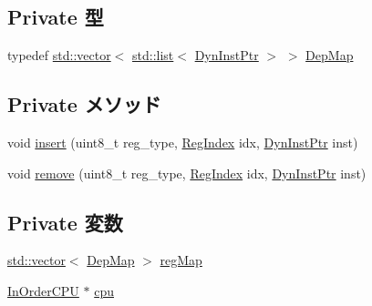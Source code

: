 \subsection*{Private 型}
\begin{DoxyCompactItemize}
\item 
typedef \hyperlink{classstd_1_1vector}{std::vector}$<$ \hyperlink{classstd_1_1list}{std::list}$<$ \hyperlink{classRefCountingPtr}{DynInstPtr} $>$ $>$ \hyperlink{classRegDepMap_ac2db38d9150d8b1c9c69bc4f6482a415}{DepMap}
\end{DoxyCompactItemize}
\subsection*{Private メソッド}
\begin{DoxyCompactItemize}
\item 
void \hyperlink{classRegDepMap_a0044f4c5dc6146067ba193f8fe6f8842}{insert} (uint8\_\-t reg\_\-type, \hyperlink{classRegDepMap_a36d25e03e43fa3bb4c5482cbefe5e0fb}{RegIndex} idx, \hyperlink{classRefCountingPtr}{DynInstPtr} inst)
\item 
void \hyperlink{classRegDepMap_a87e98fee344305ed226f0e12e43f482b}{remove} (uint8\_\-t reg\_\-type, \hyperlink{classRegDepMap_a36d25e03e43fa3bb4c5482cbefe5e0fb}{RegIndex} idx, \hyperlink{classRefCountingPtr}{DynInstPtr} inst)
\end{DoxyCompactItemize}
\subsection*{Private 変数}
\begin{DoxyCompactItemize}
\item 
\hyperlink{classstd_1_1vector}{std::vector}$<$ \hyperlink{classstd_1_1vector}{DepMap} $>$ \hyperlink{classRegDepMap_aa6afa28f783151687606a9895fb15789}{regMap}
\item 
\hyperlink{classInOrderCPU}{InOrderCPU} $\ast$ \hyperlink{classRegDepMap_a41d682c28d0f49e04393c52815808782}{cpu}
\end{DoxyCompactItemize}


